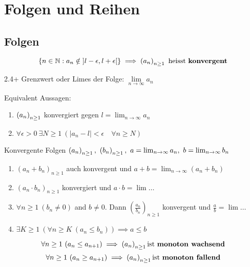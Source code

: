 \section{Folgen und Reihen}
\subsection{Folgen}
\begin{definition}{2.4}
    \[
        \left\{ n \in \mathbb{N} : a_n \notin \left] l - \epsilon, l + \epsilon \right[ \right\} \implies \left( a_n \right)_{n \ge 1}\ \mbox{heisst \textbf{konvergent}}
    \]
\end{definition}

\begin{definition}{2.4+}
    Grenzwert oder Limes der Folge: $\underset{n \to \infty}{\lim} a_n$
\end{definition}

\begin{lemma}
    Equivalent Aussagen:
    \begin{enumerate}
        \item $\left( a_n \right)_{n \ge 1}$ konvergiert gegen $l = \lim_{n \to \infty} a_n$
        \item $\forall \epsilon > 0\ \exists N \ge 1\ \left( \lvert a_n - l \rvert < \epsilon \quad \forall n \ge N \right)$
    \end{enumerate}
\end{lemma}

\begin{satz}{2.8}
    Konvergente Folgen $\left( a_n \right)_{n \ge 1},\ \left( b_n \right)_{n \ge 1},\ a = \lim_{n \to \infty} a_n,\ b = \lim_{n \to \infty} b_n$
    \begin{enumerate}
        \item $(a_n + b_n)_{n \ge 1}$ auch konvergent und $a + b = \lim_{n \to \infty} (a_n + b_n)$
        \item $(a_n \cdot b_n)_{n \ge 1}$ konvergiert und $a \cdot b = \lim \dots$
        \item $\forall n \ge 1\ (b_n \ne 0)$ and $b \ne 0$. Dann $\left(\frac{a_n}{b_n}\right)_{n \ge 1}$ konvergent und $\frac{a}{b} = \lim \dots$
        \item $\exists K \ge 1\ \left(\forall n \ge K\ (a_n \le b_n)\right) \implies a \le b$
    \end{enumerate}
\end{satz}

\begin{definition}{2.10}
    \[\forall n \ge 1\ (a_n \le a_{n + 1}) \implies \left( a_n \right)_{n \ge 1} \mbox{ist \textbf{monoton wachsend}}\]
    \[\forall n \ge 1\ (a_n \ge a_{n + 1}) \implies \left( a_n \right)_{n \ge 1} \mbox{ist \textbf{monoton fallend}}\]
\end{definition}

